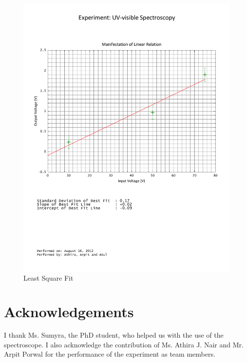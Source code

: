 	\begin{figure}[bth]
		\begin{center}
			\includegraphics[width=\linewidth]{gfx/1A_bestfit.pdf}
		\end{center}
	\caption[Least Square Fit]{Least Square Fit}
	\label{1A_graph}
	\end{figure}

\section{Acknowledgements}
I thank Ms. Sumyra, the PhD student, who helped us with the use of the spectroscope. I also acknowledge the contribution of Ms. Athira J. Nair and Mr. Arpit Porwal for the performance of the experiment as team members.